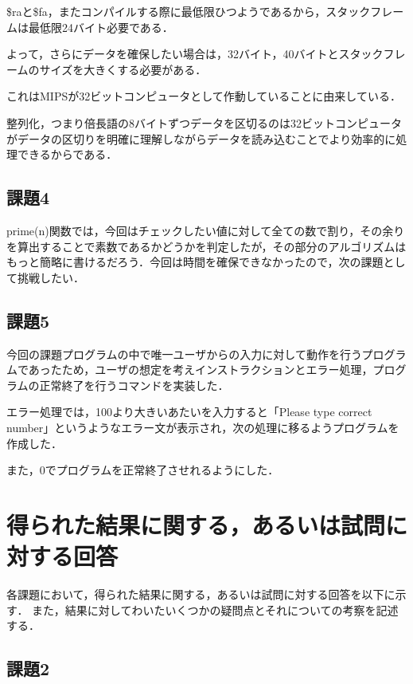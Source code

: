 \documentclass[a4j]{jarticle}
\begin{document}
\$raと\$fa，またコンパイルする際に最低限ひつようであるから，スタックフレームは最低限24バイト必要である．

よって，さらにデータを確保したい場合は，32バイト，40バイトとスタックフレームのサイズを大きくする必要がある．

これはMIPSが32ビットコンピュータとして作動していることに由来している．

整列化，つまり倍長語の8バイトずつデータを区切るのは32ビットコンピュータがデータの区切りを明確に理解しながらデータを読み込むことでより効率的に処理できるからである．




\subsection{課題4}

prime(n)関数では，今回はチェックしたい値に対して全ての数で割り，その余りを算出することで素数であるかどうかを判定したが，その部分のアルゴリズムはもっと簡略に書けるだろう．今回は時間を確保できなかったので，次の課題として挑戦したい．


\subsection{課題5}

今回の課題プログラムの中で唯一ユーザからの入力に対して動作を行うプログラムであったため，ユーザの想定を考えインストラクションとエラー処理，プログラムの正常終了を行うコマンドを実装した．

エラー処理では，100より大きいあたいを入力すると「Please type correct number」というようなエラー文が表示され，次の処理に移るようプログラムを作成した．

また，0でプログラムを正常終了させれるようにした．





%
%

\section{得られた結果に関する，あるいは試問に対する回答}


各課題において，得られた結果に関する，あるいは試問に対する回答を以下に示す．
また，結果に対してわいたいくつかの疑問点とそれについての考察を記述する．


\subsection{課題2}
\end{document}
